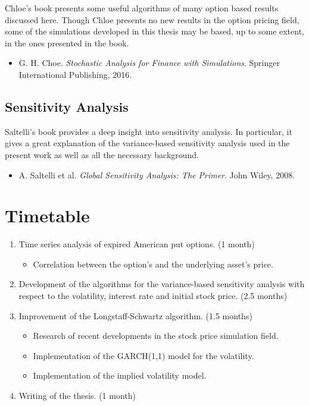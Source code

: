 \documentclass[a4paper,twocolumn,aps,prd,longbibliography,superscriptaddress]{revtex4-1}
\begin{document}
Chloe's book presents some useful algorithms of many option based results discussed here. Though Chloe presents no new results in the option pricing field, some of the simulations developed in this thesis may be based, up to some extent, in the ones presented in the book.
\begin{itemize}
\item G. H. Choe. \textit{Stochastic Analysis for Finance with Simulations}. Springer International Publishing, 2016.
\end{itemize}

\subsection{Sensitivity Analysis}
Saltelli's book provides a deep insight into sensitivity analysis. In particular, it gives a great explanation of the variance-based sensitivity analysis used in the present work as well as all the necessary background.
\begin{itemize}
\item A. Saltelli et al. \textit{Global Sensitivity Analysis: The Primer}. John Wiley, 2008.
\end{itemize}

\section{Timetable}
\begin{enumerate}
\item Time series analysis of expired American put options. (1 month)
\begin{itemize}
\item Correlation between the option's and the underlying asset's price.
\end{itemize}
\item Development of the algorithms for the variance-based sensitivity analysis with respect to the volatility, interest rate and initial stock price. (2.5 months)
\item Improvement of the Longstaff-Schwartz algorithm. (1.5 months)
\begin{itemize}
\item Research of recent developments in the stock price simulation field.
\item Implementation of the GARCH(1,1) model for the volatility.
\item Implementation of the implied volatility model.
\end{itemize}
\item Writing of the thesis. (1 month)
\end{enumerate}
\end{document}
